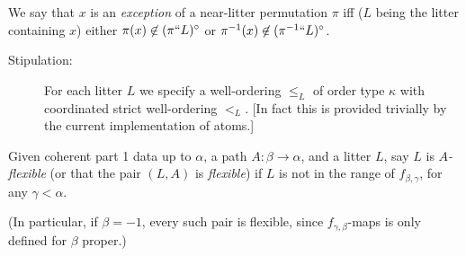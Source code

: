 \begin{definition}
\label{def:perm-exception}
\leanok
{}
We say that $x$ is an {\em exception} of a near-litter permutation $\pi$ iff ($L$ being the litter containing $x$) either $\pi(x) \not\in (\pi``L)^\circ$ or $\pi^{-1}(x) \not\in ({\pi^{-1}}``L)^\circ$.
\end{definition}

\begin{description}
\item[Stipulation:]  For each litter $L$ we specify a well-ordering $\leq_L$ of order type $\kappa$ with coordinated strict well-ordering $<_L$.  [In fact this is provided trivially by the current implementation of atoms.]
\end{description}

\begin{definition}
  \label{def:flexible}
  Given coherent part 1 data up to $\alpha$, a path $A : \beta \to \alpha$, and a litter $L$, say $L$ is \emph{$A$-flexible} (or that the pair $(L,A)$ is \emph{flexible}) if $L$ is not in the range of $f_{\beta,\gamma}$, for any $\gamma < \alpha$.

  (In particular, if $\beta = -1$, every such pair is flexible, since $f_{\gamma,\beta}$-maps is only defined for $\beta$ proper.)
\end{definition}

